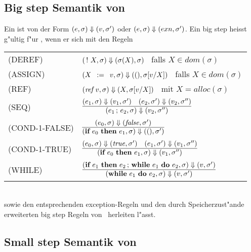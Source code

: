 \subsection{Big step Semantik von \LFOUR}

Ein  ist von der Form $(e,\sigma) \Downarrow (v,\sigma')$ oder $(e,\sigma) \Downarrow (exn,\sigma')$. Ein big step
heisst g"ultig f"ur \LFOUR, wenn er sich mit den Regeln\\[5mm]
  \begin{tabular}{ll}
    \mbox{(DEREF)}        & $(\,!\,\,X, \sigma) \Downarrow (\sigma(X), \sigma)$   \ falls $X \in dom(\sigma)$ \\[3mm]
    \mbox{(ASSIGN)}       & $(X\,\ :=\ \,v, \sigma) \Downarrow ((), \sigma[v/X])$ \ falls $X \in dom(\sigma)$ \\[3mm]
    \mbox{(REF)}          & $({\text{\it ref\/}}\,v, \sigma) \Downarrow (X, \sigma[v/X])$        \ mit $X = alloc(\sigma)$ \\[3mm]
    \mbox{(SEQ)}          & $\regel{(e_1,\sigma) \eval (v_1,\sigma') \quad (e_2,\sigma') \eval (v_2,\sigma'')}
                                   {(e_1\,;\,e_2,\sigma) \eval (v_2,\sigma'')}$ \\[5mm]
    \mbox{(COND-1-FALSE)} & $\regel{(e_0,\sigma) \eval (\false,\sigma')}
                                   {(\bift{e_0}{e_1},\sigma) \eval ((), \sigma')}$ \\[5mm]
    \mbox{(COND-1-TRUE)}  & $\regel{(e_0,\sigma) \eval (\true,\sigma') \quad (e_1,\sigma') \eval (v_1,\sigma'')}
                                   {(\bift{e_0}{e_1},\sigma) \eval (v_1,\sigma'')}$ \\[5mm]
    \mbox{(WHILE)}        & $\regel{(\bift{e_1}{e_2\,;\,\bwd{e_1}{e_2}}, \sigma) \eval (v,\sigma')}
                                   {(\bwd{e_1}{e_2}, \sigma) \eval (v,\sigma')}$
  \end{tabular}\\[7mm]
sowie den entsprechenden exception-Regeln und den durch Speicherzust"ande erweiterten big step Regeln von \LTHREE\ 
herleiten l"asst.


\subsection{Small step Semantik von \LFOUR}

